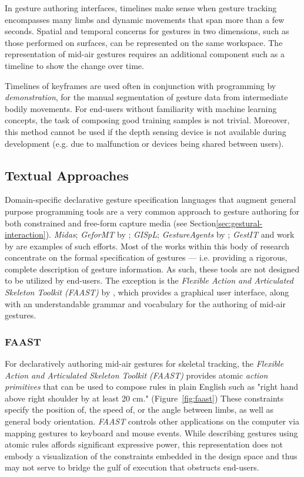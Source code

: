 In gesture authoring interfaces, timelines make sense when gesture tracking encompasses many limbs and dynamic movements that span more than a few seconds. Spatial and temporal concerns for gestures in two dimensions, such as those performed on surfaces, can be represented on the same workspace. The representation of mid-air gestures requires an additional component such as a timeline to show the change over time.

Timelines of keyframes are used often in conjunction with programming by \emph{demonstration}, for the manual segmentation of gesture data from intermediate bodily movements. For end-users without familiarity with machine learning concepts, the task of composing good training samples is not trivial. Moreover, this method cannot be used if the depth sensing device is not available during development (e.g. due to malfunction or devices being shared between users).

\subsection{Textual Approaches}

Domain-specific declarative gesture specification languages that augment general purpose programming tools are a very common approach to gesture authoring for both constrained and free-form capture media (see Section\ref{sec:gestural-interaction}).  \emph{Midas}; \emph{GeforMT} by \textcite{Kammer:2010};  \emph{GISpL}; \emph{GestureAgents} by \textcite{Julia:2013};  \emph{GestIT} and work by \textcite{Khandkar:2010} are examples of such efforts. Most of the works within this body of research concentrate on the formal specification \parencite{Lamsweerde:2000, Sommerville:2010} of gestures --- i.e. providing a rigorous, complete description of gesture information. As such, these tools are not designed to be utilized by end-users. The exception is the \emph{Flexible Action and Articulated Skeleton Toolkit (FAAST)} by \textcite{Suma:2013}, which provides a graphical user interface, along with an understandable grammar and vocabulary for the authoring of mid-air gestures.

\subsubsection{FAAST}

For declaratively authoring mid-air gestures for skeletal tracking, the \emph{Flexible Action and Articulated Skeleton Toolkit (FAAST)} \parencite{Suma:2013} provides atomic \emph{action primitives} that can be used to compose rules in plain English such as "right hand above right shoulder by at least 20 cm." (Figure~\ref{fig:faast}) These constraints specify the position of, the speed of, or the angle between limbs, as well as general body orientation. \emph{FAAST} controls other applications on the computer via mapping gestures to keyboard and mouse events. While describing gestures using atomic rules affords significant expressive power, this representation does not embody a visualization of the constraints embedded in the design space and thus may not serve to bridge the gulf of execution that obstructs end-users.

